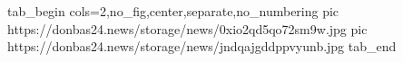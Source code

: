  
 
 
 
 


\ifcmt
  tab_begin cols=2,no_fig,center,separate,no_numbering
     pic https://donbas24.news/storage/news/0xio2qd5qo72sm9w.jpg
     pic https://donbas24.news/storage/news/jndqajgddppvyunb.jpg
  tab_end
\fi
